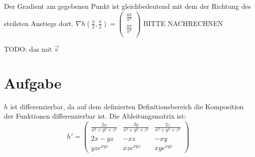\documentclass[10pt,a4paper,parskip=half]{scrartcl}
\newcommand{\vectwo}[2]{\left(\begin {array} {c} #1 \\ #2 \\ \end {array} \right)}
\begin{document}
\begin{enumerate}[(i)]
Der Gradient am gegebenen Punkt ist gleichbedeutend mit dem der Richtung des steilsten Anstiegs dort. \(\nabla h(\frac{\pi}{2},\frac{\pi}{2}) = \vectwo{\frac{4\pi}{\pi^4}}{\frac{4\pi}{\pi^4}}\) BITTE NACHRECHNEN

TODO: das mit \(\vec v \)

\section{Aufgabe}
$h$ ist differenzierbar, da auf dem definierten Definitionsbereich die Komposition der Funktionen differenzierbar ist. Die Ableitungsmatrix ist:
$$h' =\begin{pmatrix}
\frac{2x}{x^2 + y^2 + z^2} & \frac{2y}{x^2 + y^2 + z^2} & \frac{2z}{x^2 + y^2 + z^2} \\
2x - yz & -xz & -xy \\
yze^{xyz}  & xze^{xyz} & xye^{xyz} 
\end{pmatrix}  $$


\end{enumerate}
\end{document}

